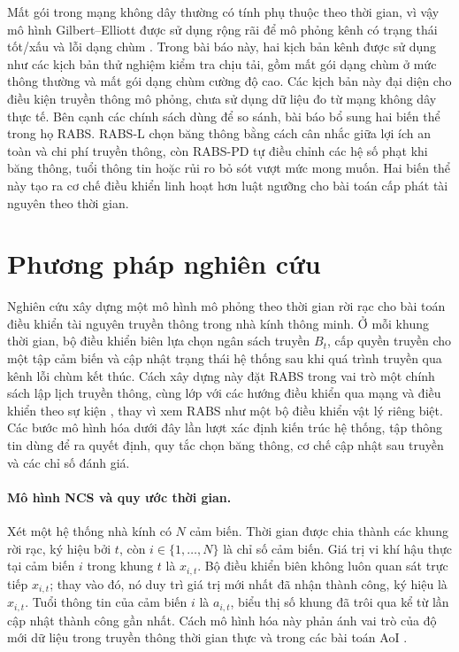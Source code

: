 \documentclass[10pt]{article}
\begin{document}
Mất gói trong mạng không dây thường có tính phụ thuộc theo thời gian, vì vậy mô hình Gilbert--Elliott được sử dụng rộng rãi để mô phỏng kênh có trạng thái tốt/xấu và lỗi dạng chùm \cite{gilbert1960capacity,elliott1963estimates}. Trong bài báo này, hai kịch bản kênh được sử dụng như các kịch bản thử nghiệm kiểm tra chịu tải, gồm mất gói dạng chùm ở mức thông thường và mất gói dạng chùm cường độ cao. Các kịch bản này đại diện cho điều kiện truyền thông mô phỏng, chưa sử dụng dữ liệu đo từ mạng không dây thực tế. Bên cạnh các chính sách dùng để so sánh, bài báo bổ sung hai biến thể trong họ RABS. RABS-L chọn băng thông bằng cách cân nhắc giữa lợi ích an toàn và chi phí truyền thông, còn RABS-PD tự điều chỉnh các hệ số phạt khi băng thông, tuổi thông tin hoặc rủi ro bỏ sót vượt mức mong muốn. Hai biến thể này tạo ra cơ chế điều khiển linh hoạt hơn luật ngưỡng cho bài toán cấp phát tài nguyên theo thời gian.

\section{Phương pháp nghiên cứu}
Nghiên cứu xây dựng một mô hình mô phỏng theo thời gian rời rạc cho bài toán điều khiển tài nguyên truyền thông trong nhà kính thông minh. Ở mỗi khung thời gian, bộ điều khiển biên lựa chọn ngân sách truyền $B_t$, cấp quyền truyền cho một tập cảm biến và cập nhật trạng thái hệ thống sau khi quá trình truyền qua kênh lỗi chùm kết thúc. Cách xây dựng này đặt RABS trong vai trò một chính sách lập lịch truyền thông, cùng lớp với các hướng điều khiển qua mạng và điều khiển theo sự kiện \cite{hespanha2007survey,tabuada2007event,heemels2012event,lu2023codesign}, thay vì xem RABS như một bộ điều khiển vật lý riêng biệt. Các bước mô hình hóa dưới đây lần lượt xác định kiến trúc hệ thống, tập thông tin dùng để ra quyết định, quy tắc chọn băng thông, cơ chế cập nhật sau truyền và các chỉ số đánh giá.

\paragraph{Mô hình NCS và quy ước thời gian.}
Xét một hệ thống nhà kính có $N$ cảm biến. Thời gian được chia thành các khung rời rạc, ký hiệu bởi $t$, còn $i\in\{1,\ldots,N\}$ là chỉ số cảm biến. Giá trị vi khí hậu thực tại cảm biến $i$ trong khung $t$ là $x_{i,t}$. Bộ điều khiển biên không luôn quan sát trực tiếp $x_{i,t}$; thay vào đó, nó duy trì giá trị mới nhất đã nhận thành công, ký hiệu là $\hat{x}_{i,t}$. Tuổi thông tin của cảm biến $i$ là $a_{i,t}$, biểu thị số khung đã trôi qua kể từ lần cập nhật thành công gần nhất. Cách mô hình hóa này phản ánh vai trò của độ mới dữ liệu trong truyền thông thời gian thực và trong các bài toán AoI \cite{kaul2012realtime,sun2017update,mena2022aoi}.
\end{document}
